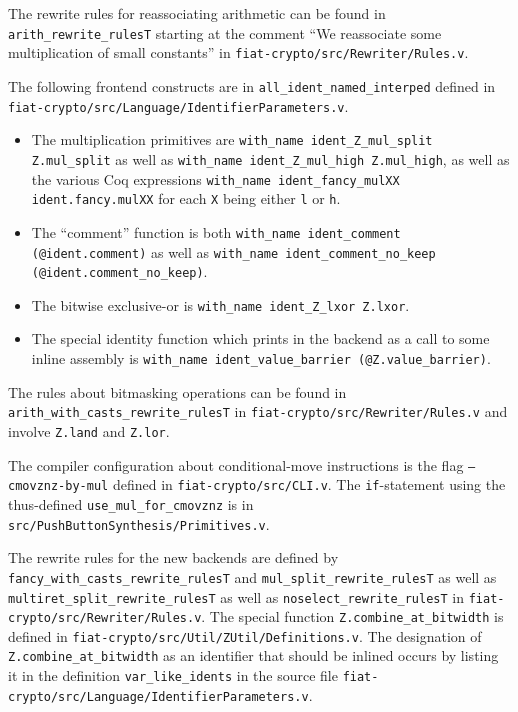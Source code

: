 \documentclass[a4paper,USenglish,cleveref,autoref,thm-restate]{lipics-v2021}
\begin{document}
The rewrite rules
for reassociating arithmetic
can be found in \texttt{arith_rewrite_rulesT} starting at the comment ``We reassociate some multiplication of small constants'' in \texttt{fiat-crypto/src/Rewriter/Rules.v}.

The
following
frontend constructs
are in \verb|all_ident_named_interped| defined in \texttt{fiat-crypto/src/Language/IdentifierParameters.v}.
\begin{itemize}
\item
  The multiplication primitives are \texttt{with_name ident_Z_mul_split Z.mul_split} as well as \texttt{with_name ident_Z_mul_high Z.mul_high}, as well as the various Coq expressions \texttt{with_name ident_fancy_mulXX ident.fancy.mulXX} for each \texttt{X} being either \texttt{l} or \texttt{h}.
\item
  The ``comment'' function is both \texttt{with_name ident_comment (@ident.comment)} as well as \texttt{with_name ident_comment_no_keep (@ident.comment_no_keep)}.
\item
  The bitwise exclusive-or is \texttt{with_name ident_Z_lxor Z.lxor}.
\item
  The special identity function which prints in the backend as a call to some inline assembly is \texttt{with_name ident_value_barrier (@Z.value_barrier)}.
\end{itemize}

The rules about bitmasking operations
can be found in \texttt{arith_with_casts_rewrite_rulesT} in \texttt{fiat-crypto/src/Rewriter/Rules.v} and involve \texttt{Z.land} and \texttt{Z.lor}.

The compiler configuration about conditional-move instructions is the flag \texttt{--cmovznz-by-mul} defined in \texttt{fiat-crypto/src/CLI.v}.
The \texttt{if}-statement using the thus-defined \texttt{use_mul_for_cmovznz} is in \texttt{src/PushButtonSynthesis/Primitives.v}.

The rewrite rules for the new backends
are defined by \texttt{fancy_with_casts_rewrite_rulesT} and \texttt{mul_split_rewrite_rulesT} as well as \texttt{multiret_split_rewrite_rulesT} as well as \texttt{noselect_rewrite_rulesT} in \texttt{fiat-crypto/src/Rewriter/Rules.v}.
The special function \texttt{Z.combine_at_bitwidth} is defined in \texttt{fiat-crypto/src/Util/ZUtil/Definitions.v}.
The designation of \texttt{Z.combine_at_bitwidth} as an identifier that should be inlined occurs by listing it in the definition \texttt{var_like_idents} in the source file \texttt{fiat-crypto/src/Language/IdentifierParameters.v}.
\end{document}

